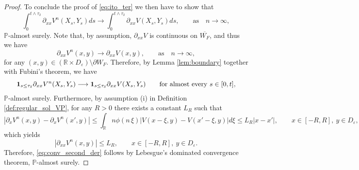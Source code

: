 \documentclass[10pt]{article}
\numberwithin{equation}{section}
\theoremstyle{plain}
\numberwithin{theorem}{section}
\theoremstyle{definition}
\def \R {\mathbb{R}}
\newcommand{\<}{\langle}
\renewcommand{\>}{\rangle}
\renewcommand{\(}{\left(}
\renewcommand{\)}{\right)}
\newcommand\Pb{\mathbb{P}}
\newcommand\eps{\varepsilon}
\def \R  {{\mathbb {R}}}
\def \eps {{\varepsilon}}
\def \R {{\mathbb {R}}}
\def \eps {{\varepsilon}}
\begin{document}
{{{\begin{proof}
To conclude the proof of \eqref{eq:ito_ter} we then have to show that
\begin{equation}\label{eq:conv_second_der}
\int_{0}^{t\wedge \tau_{\delta}} \partial_{xx} V^n (X_s , Y_s ) ds \longrightarrow \int_{0}^{t\wedge \tau_{\delta}} \partial_{xx} V (X_s , Y_s ) ds, \qquad \text{as}\quad n\to \infty,
\end{equation}
$\Pb$-almost surely. Note that, by assumption, $\partial_{xx}V$ is continuous on $\overline{W_F}%
$, and thus we have
\begin{equation}%
\partial_{xx} V^n (x ,y ) \longrightarrow \partial_{xx} V (x ,y ),  \qquad \text{as}\quad n\to \infty,
\end{equation}
for any $(x,y)\in (\R\times D_{\eps}) \setminus \partial W_F$. Therefore, by Lemma \ref{lem:boundary} together with Fubini's theorem, we have 
\begin{equation}%
{\bf 1}_{s\leq \tau_{\delta}} \partial_{xx} V^n (X_s , Y_s ) \longrightarrow {\bf 1}_{s\leq \tau_{\delta}} \partial_{xx} V (X_s , Y_s ) \qquad \text{for almost every }s\in[0,t], 
\end{equation}
$\Pb$-almost surely. Furthermore, by assumption (i) in Definition \ref{def:regular_sol_VP}, for any $R>0$ there exists a constant $L_R$ such that
\begin{equation}%
|\partial_{x} V^n (x , y ) - \partial_{x} V^n (x' , y ) | \leq \int_{\R} n\phi (n\, \xi ) | V(x-\xi,y) - V(x' - \xi,y)| d\xi \leq L_{R} |x - x'|, \qquad x\in[-R,R],\ y\in {D}_{\eps},
\end{equation}
which yields 
\begin{equation}%
|\partial_{xx} V^n (x , y )| \leq L_R, \qquad x\in[-R,R],\ y\in {D}_{\eps}.
\end{equation}
Therefore, \eqref{eq:conv_second_der} follows by Lebesgue's dominated convergence theorem, $\Pb$-almost surely.

\vspace{2pt}


\end{proof}}}}
\end{document}
